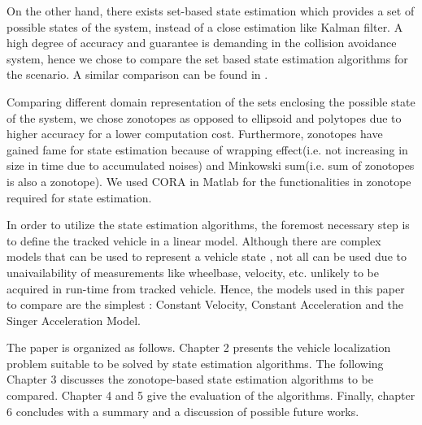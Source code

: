 On the other hand, there exists set-based state estimation which provides a set of possible states of the system, instead of a close estimation like Kalman filter. A high degree of accuracy and guarantee is demanding in the collision avoidance system, hence we chose to compare the set based state estimation algorithms for the scenario. A similar comparison can be found in \cite{Rath}.

Comparing different domain representation of the sets enclosing the possible state of the system, we chose zonotopes as opposed to ellipsoid and polytopes due to higher accuracy for a lower computation cost. Furthermore, zonotopes have gained fame for state estimation because of wrapping effect(i.e. not increasing in size in time due to accumulated noises) and Minkowski sum(i.e. sum of zonotopes is also a zonotope). We used CORA in Matlab for the functionalities in zonotope required for state estimation.

In order to utilize the state estimation algorithms, the foremost necessary step is to define the tracked vehicle in a linear model. Although there are complex models that can be used to represent a vehicle state \cite{Althoff}, not all can be used due to unaivailability of measurements like wheelbase, velocity, etc. unlikely to be acquired in run-time from tracked vehicle. Hence, the models used in this paper to compare are the simplest : Constant Velocity, Constant Acceleration and the Singer Acceleration Model.

The paper is organized as follows. Chapter 2 presents the vehicle localization problem suitable to be solved by state estimation algorithms. The following Chapter 3 discusses the zonotope-based state estimation algorithms to be compared. Chapter 4 and 5 give the evaluation of the algorithms. Finally, chapter 6 concludes with a summary and a discussion of possible future works.




